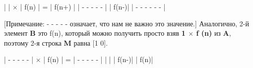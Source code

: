 \vspace{\baselineskip}
\begin{tcolorbox}
|\hspace{2mm} \hspace{6mm}\hspace{2mm}|\hspace{3mm} $\times$ \hspace{3mm}| \hspace{3mm} f(n) \hspace{3mm}|\hspace{3mm} = \hspace{3mm} |\hspace{1,5mm} f(n+)\hspace{1,5mm} |\newline
|\hspace*{0,3mm} - - - - -\hspace{0,3mm} |\hspace*{10,5mm}     |\hspace*{2,5mm} f(n-)\hspace*{2,7mm}| \hspace*{10,5mm}    | - - - - - - |
\end{tcolorbox}

\vspace{\baselineskip}
[Примечание: - - - - - означает, что нам не важно это значение.]\newline
Аналогично, 2-й элемент \textbf{B} это f(n), который можно получить просто взяв \textbf{1 $\times$ f (n)} из \textbf{A}, поэтому 2-я строка \textbf{M} равна [1 0].

\vspace{\baselineskip}
\begin{tcolorbox}
|\hspace{0,3mm} - - - - - \hspace{0,3mm}|\hspace{3mm} $\times$ \hspace{3mm}| \hspace{3mm} f(n) \hspace{3mm}|\hspace{3mm}  = \hspace{3mm} |\hspace{0,3mm} - - - - - \hspace{0,3mm} |\newline
|\hspace{1,5mm} \hspace{6mm}\hspace{1,5mm} |\hspace*{10,5mm}     |\hspace*{2,5mm} f(n-)\hspace*{2,9mm}| \hspace*{10,5mm}    |\hspace*{4,5mm} f(n)\hspace*{4,5mm}|
\end{tcolorbox}


